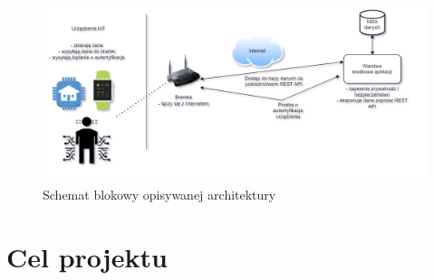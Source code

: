 \documentclass[12pt, twoside, openany]{mwrep}
\begin{document}
\begin{figure}[H]
\centering
\includegraphics[scale=0.5]{bezpieczenstwo}
\caption{Schemat blokowy opisywanej architektury}
\end{figure}

\chapter{Cel projektu}
\end{document}
